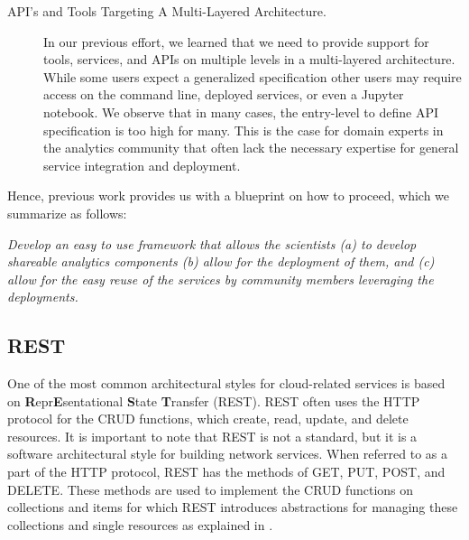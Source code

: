 \begin{description}
\item[API's and Tools Targeting A Multi-Layered Architecture.] In our
  previous effort, we learned that we need to provide support for
  tools, services, and APIs on multiple levels in a multi-layered
  architecture. While some users expect a generalized specification other users may require access on the command line, deployed services, or even a Jupyter notebook. We observe that in many cases,
  the entry-level to define API specification is too high for many. This is the case for domain experts in the analytics community that often lack the necessary expertise for general service integration and deployment.

\end{description}

Hence, previous work provides us with a blueprint on how to proceed, which we summarize as 
follows:

{\em Develop an easy to use framework that allows the scientists (a) to develop shareable analytics components (b) allow for the deployment of them, and (c) allow for the easy reuse of the services by community members leveraging the deployments.} 



\subsection{REST}\label{rest}

One of the most common architectural styles for cloud-related services is based on {\bf R}epr{\bf E}sentational {\bf S}tate {\bf T}ransfer (REST). REST often uses
the HTTP protocol for the CRUD functions, which create, read, update, and
delete resources. It is important to note that REST is not a standard,
but it is a software architectural style for building network services.
When referred to as a part of the HTTP protocol, REST has the methods of
GET, PUT, POST, and DELETE. These methods are used to implement the CRUD
functions on collections and items for which REST introduces abstractions for managing these collections and single resources \cite{las-book-cloud} as explained in .


